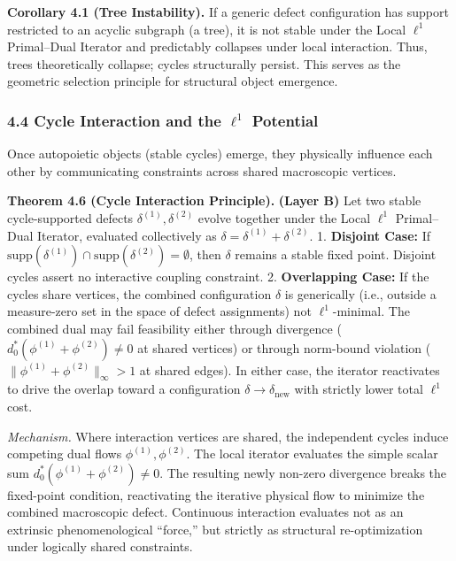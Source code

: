 \documentclass[
]{article}
\begin{document}
\textbf{Corollary 4.1 (Tree Instability).} If a generic defect
configuration has support restricted to an acyclic subgraph (a tree), it
is not stable under the Local \(\ell^1\) Primal--Dual Iterator and
predictably collapses under local interaction. Thus, trees theoretically
collapse; cycles structurally persist. This serves as the geometric
selection principle for structural object emergence.

\subsubsection{\texorpdfstring{4.4 Cycle Interaction and the \(\ell^1\)
Potential}{4.4 Cycle Interaction and the \textbackslash ell\^{}1 Potential}}\label{cycle-interaction-and-the-ell1-potential}

Once autopoietic objects (stable cycles) emerge, they physically
influence each other by communicating constraints across shared
macroscopic vertices.

\textbf{Theorem 4.6 (Cycle Interaction Principle).} \textbf{(Layer B)}
Let two stable cycle-supported defects \(\delta^{(1)}, \delta^{(2)}\)
evolve together under the Local \(\ell^1\) Primal--Dual Iterator,
evaluated collectively as \(\delta = \delta^{(1)} + \delta^{(2)}\). 1.
\textbf{Disjoint Case:} If
\(\text{supp}(\delta^{(1)}) \cap \text{supp}(\delta^{(2)}) = \emptyset\),
then \(\delta\) remains a stable fixed point. Disjoint cycles assert no
interactive coupling constraint. 2. \textbf{Overlapping Case:} If the
cycles share vertices, the combined configuration \(\delta\) is
generically (i.e., outside a measure-zero set in the space of defect
assignments) not \(\ell^1\)-minimal. The combined dual may fail
feasibility either through divergence
(\(d_0^*(\phi^{(1)} + \phi^{(2)}) \neq 0\) at shared vertices) or
through norm-bound violation (\(\|\phi^{(1)} + \phi^{(2)}\|_\infty > 1\)
at shared edges). In either case, the iterator reactivates to drive the
overlap toward a configuration \(\delta \to \delta_{\text{new}}\) with
strictly lower total \(\ell^1\) cost.

\emph{Mechanism.} Where interaction vertices are shared, the independent
cycles induce competing dual flows \(\phi^{(1)}, \phi^{(2)}\). The local
iterator evaluates the simple scalar sum
\(d_0^*(\phi^{(1)} + \phi^{(2)}) \neq 0\). The resulting newly non-zero
divergence breaks the fixed-point condition, reactivating the iterative
physical flow to minimize the combined macroscopic defect. Continuous
interaction evaluates not as an extrinsic phenomenological ``force,''
but strictly as structural re-optimization under logically shared
constraints.
\end{document}
